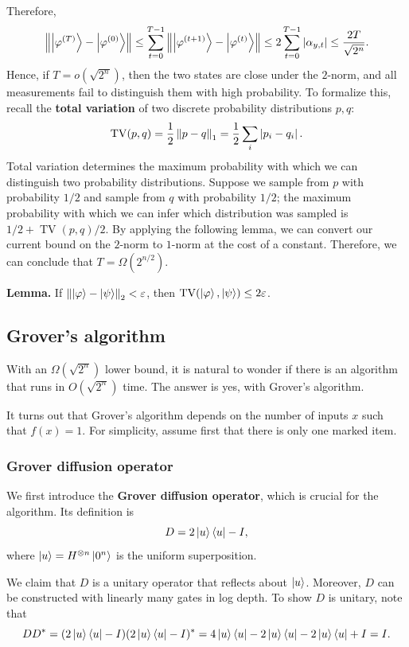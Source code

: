 \documentclass[a4paper,draft]{article}
\begin{document}
Therefore,
\[
  \left\lVert \left\lvert \varphi^{(T)}\right\rangle - \left\lvert \varphi^{(0)}\right\rangle\right\rVert
  \leq \sum_{t = 0}^{T - 1} \left\lVert \left\lvert \varphi^{(t + 1)}\right\rangle - \left\lvert \varphi^{(t)}\right\rangle\right\rVert
  \leq 2 \sum_{t = 0}^{T - 1} \left\lvert \alpha_{y, t}\right\rvert
  \leq \frac{2 T}{\sqrt{2^n}}.
\]
Hence, if $T = o (\sqrt{2^n})$, then the two states are close under the
  $2$-norm, and all measurements fail to distinguish them with high
  probability. To formalize this, recall the \textbf{total variation} of
  two discrete probability distributions $p, q$:
\[
  \operatorname{TV}(p, q)
  = \frac{1}{2} \left\lVert p - q\right\rVert_1
  = \frac{1}{2} \sum_i \left\lvert p_i - q_i\right\rvert.
\]
Total variation determines the maximum probability with which we can
  distinguish two probability distributions. Suppose we sample from $p$
  with probability $1/2$ and sample from $q$ with probability $1/2$; the
  maximum probability with which we can infer which distribution was
  sampled is $1/2 + \operatorname{TV} (p, q) / 2$. By applying the
  following lemma, we can convert our current bound on the $2$-norm to
  $1$-norm at the cost of a constant. Therefore, we can conclude that $T =
  \Omega(2^{n / 2})$.

\textbf{Lemma.} If $\left\lVert \left\lvert \varphi\right\rangle - \left\lvert \psi\right\rangle\right\rVert_2 < \varepsilon$, then
$\operatorname{TV} (\left\lvert \varphi\right\rangle, \left\lvert \psi\right\rangle) \leq 2 \varepsilon$.

\subsection{Grover's algorithm}

With an $\Omega(\sqrt{2^n})$ lower bound, it is natural to wonder if there
is an algorithm that runs in $O(\sqrt{2^n})$ time. The answer is yes, with
Grover's algorithm.

It turns out that Grover's algorithm depends on the number of inputs $x$
such that $f(x) = 1$. For simplicity, assume first that there is only one
marked item.

\subsubsection*{Grover diffusion operator}

We first introduce the \textbf{Grover diffusion operator}, which is
crucial for the algorithm. Its definition is
\[
  D = 2 \left\lvert u\right\rangle \left\langle u \right\rvert - I,
\]
where $\left\lvert u\right\rangle = H^{\otimes n} \left\lvert 0^n\right\rangle$ is the uniform
  superposition.

We claim that $D$ is a unitary operator that reflects about $\left\lvert u\right\rangle$.
Moreover, $D$ can be constructed with linearly many gates in log depth. To
show $D$ is unitary, note that
\[
  D D^*
  = (2 \left\lvert u\right\rangle \left\langle u \right\rvert - I) (2 \left\lvert u\right\rangle \left\langle u \right\rvert - I)^*
  = 4 \left\lvert u\right\rangle \left\langle u \right\rvert - 2 \left\lvert u\right\rangle \left\langle u \right\rvert - 2 \left\lvert u\right\rangle \left\langle u \right\rvert  + I
  = I.
\]
\end{document}
